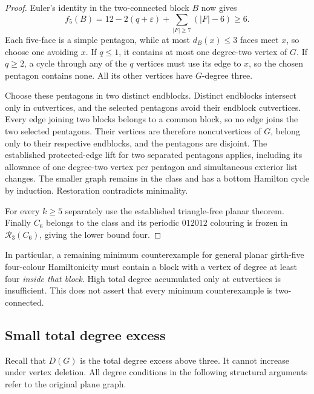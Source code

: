 \documentclass[11pt]{article}
\theoremstyle{remark}
\newcommand{\R}{\mathcal R}
\numberwithin{equation}{section}
\numberwithin{table}{section}
\begin{document}
\begin{proof}
Euler's identity in the two-connected block $B$ now gives
\[
 f_5(B)=12-2(q+\varepsilon)+\sum_{|F|\ge7}(|F|-6)\ge6.
\]
Each five-face is a simple pentagon, while at most $d_B(x)\le3$
faces meet $x$, so choose one avoiding $x$. If $q\le1$, it contains
at most one degree-two vertex of $G$. If $q\ge2$, a cycle through
any of the $q$ vertices must use its edge to $x$, so the chosen
pentagon contains none. All its other vertices have $G$-degree three.

Choose these pentagons in two distinct endblocks. Distinct endblocks
intersect only in cutvertices, and the selected pentagons avoid their
endblock cutvertices. Every edge joining two blocks belongs to a common
block, so no edge joins the two selected pentagons. Their vertices are
therefore noncutvertices of $G$, belong only to their respective
endblocks, and the pentagons are disjoint.
The established protected-edge lift for two separated pentagons
applies, including its allowance of one degree-two vertex per
pentagon and simultaneous exterior list changes. The smaller graph
remains in the class and has a bottom Hamilton cycle by induction.
Restoration contradicts minimality.

For every $k\ge5$ separately use the established triangle-free
planar theorem. Finally $C_6$ belongs to the class and its periodic
$012012$ colouring is frozen in $\R_3(C_6)$, giving the lower bound
four.
\end{proof}
In particular, a remaining minimum counterexample for general
planar girth-five four-colour Hamiltonicity must contain a block
with a vertex of degree at least four \emph{inside that block}.
High total degree accumulated only at cutvertices is insufficient.
This does not assert that every minimum counterexample is two-connected.


\subsection{Small total degree excess}
Recall that $D(G)$ is the total degree excess above three.
It cannot increase under vertex deletion. All degree conditions
in the following structural arguments refer to the original plane graph.
\end{document}
